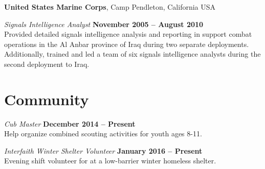 \documentclass[margin,line]{res}
\begin{document}
\begin{resume}
{\bf United States Marine Corps}, Camp Pendleton, California USA

\vspace{-.3cm}
{\em Signals Intelligence Analyst} \hfill {\bf November 2005 -- August 2010}\\
Provided detailed signals intelligence analysis and reporting in
support combat operations in the Al Anbar province of Iraq during two
separate deployments. Additionally, trained and led a team of six
signals intelligence analysts during the second deployment to Iraq.

\section{\sc Community}

{\em Cub Master} \hfill {\bf December 2014 -- Present}\\
Help organize combined scouting activities for youth ages 8-11.

\vspace{-.3cm} {\em Interfaith Winter Shelter Volunteer} \hfill {\bf
  January 2016 -- Present }\\ Evening shift volunteer for at a
low-barrier winter homeless shelter.


\end{resume}
\end{document}
